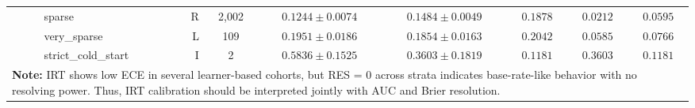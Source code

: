 \begin{table}[htbp]
{\begin{tabular}{lllrcccccc}
 &  & sparse & R & 2,002 & $0.1244 \pm 0.0074$ & $0.1484 \pm 0.0049$ & $0.1878$ & $0.0212$ & $0.0595$ \\
 &  & very\_sparse & L & 109 & $0.1951 \pm 0.0186$ & $0.1854 \pm 0.0163$ & $0.2042$ & $0.0585$ & $0.0766$ \\
 &  & strict\_cold\_start & I & 2 & $0.5836 \pm 0.1525$ & $0.3603 \pm 0.1819$ & $0.1181$ & $0.3603$ & $0.1181$ \\
\bottomrule
\multicolumn{10}{p{17.5cm}}{\scriptsize \textbf{Note:} IRT shows low ECE in several learner-based cohorts, but RES = 0 across strata indicates base-rate-like behavior with no resolving power. Thus, IRT calibration should be interpreted jointly with AUC and Brier resolution.} \\
\end{tabular}%
}
\end{table}
